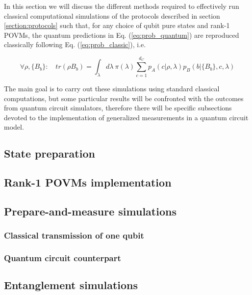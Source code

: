 In this section we will discuss the different methods required to effectively run classical computational simulations of the protocols described in section \ref{section:protocols} such that, for any choice of qubit pure states and rank-1 POVMs, the quantum predictions in Eq. (\ref{eq:prob_quantum}) are reproduced classically following Eq. (\ref{eq:prob_classic}), i.e.

\begin{equation}
\forall \rho, \{B_b\}:\quad tr(\rho B_b) = \int_{\lambda} d\lambda\ \pi(\lambda) \sum_{c=1}^{d_C} p_A(c|\rho, \lambda) p_B(b|\{B_b\}, c, \lambda)    
\end{equation}

The main goal is to carry out these simulations using standard classical computations, but some particular results will be confronted with the outcomes from quantum circuit simulators, therefore there will be specific subsections devoted to the implementation of generalized measurements in a quantum circuit model. 
\subsection{State preparation}

\subsection{Rank-1 POVMs implementation}

\subsection{Prepare-and-measure simulations}
\subsubsection{Classical transmission of one qubit}

\subsubsection{Quantum circuit counterpart}

\subsection{Entanglement simulations}
